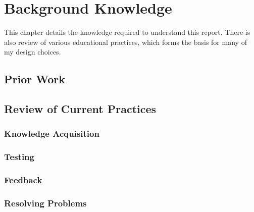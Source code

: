 \chapter{Background Knowledge}
  This chapter details the knowledge required to understand this report. There is also review of various educational practices, which forms the basis for many of my design choices.

  \section{Prior Work}
  \section{Review of Current Practices}
    \subsection{Knowledge Acquisition}
    \subsection{Testing}
    \subsection{Feedback}
    \subsection{Resolving Problems}
